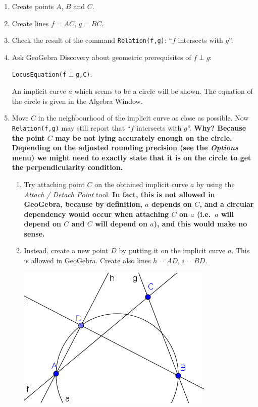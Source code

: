 \documentclass{article}
\begin{document}
\begin{enumerate}
    \item Create points $A$, $B$ and $C$.
    \item Create lines $f=AC$, $g=BC$.
    \item Check the result of the command \texttt{Relation(f,g)}: ``$f$ intersects with $g$''.
    \item Ask GeoGebra Discovery about geometric prerequisites of $f\perp g$:
\begin{center}\texttt{LocusEquation(f$\perp$g,C)}.\end{center}
An implicit curve $a$ which seems to be a circle will be shown. The equation of the circle
is given in the Algebra Window.
    \item Move $C$ in the neighbourhood of the implicit curve as close as possible. Now \texttt{Relation(f,g)} may still report that ``$f$ intersects with $g$''. \textbf{Why? Because the point $C$ may be not lying accurately enough on the circle. Depending on the adjusted rounding precision (see the \textit{Options} menu) we might need to exactly state that it is on the circle to get the perpendicularity condition.}
    \begin{enumerate}
      \item Try attaching point $C$ on the obtained implicit curve $a$ by using the \textit{Attach / Detach Point} tool. \textbf{In fact, this is not allowed in GeoGebra, because by definition, $a$ depends on $C$, and a circular dependency  would occur when attaching $C$ on $a$ (i.e.~$a$ will depend on $C$ and $C$ will depend on $a$), and this would make no sense.}
      \item Instead, create a new point $D$ by putting it on the implicit curve $a$. This is allowed in GeoGebra. Create also lines $h=AD$, $i=BD$.
\begin{center}
\includegraphics[scale=0.5]{limitations-Thales1-2}

\end{center}
\end{enumerate}
\end{enumerate}
\end{document}
